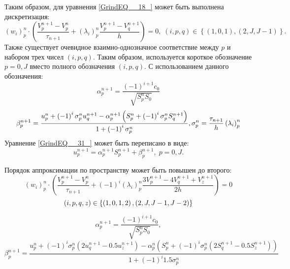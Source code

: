 Таким образом, для уравнения \eqref{GrindEQ__18_} может быть выполнена дискретизация:
\begin{equation} \label{GrindEQ__31_} 
\left(w_{i} \right)_{p}^{n} \cdot \left(\frac{V_{p}^{n+1} -V_{p}^{n} }{\tau _{n+1} } +\left(\lambda _{i} \right)_{p}^{n} \frac{V_{p}^{n+1} -V_{q}^{n+1} }{h} \right)=0,\; \left(i,p,q\right)\in \left\{\left(1,0,1\right),\left(2,J,J-1\right)\right\}.  
\end{equation} 
Также существует очевидное взаимно-однозначное соответствие между $p$ и набором трех чисел $\left(i,p,q\right)$. Таким образом, используется короткое обозначение $p=0,J$ вместо полного обозначения $\left(i,p,q\right)$. С использованием данного обозначения:
\begin{equation} \label{GrindEQ__32_} 
\alpha _{p}^{n+1} =\frac{\left(-1\right)^{i+1} c_{0} }{\sqrt{S_{p}^{n} S_{0} } } 
\end{equation} 
\begin{equation} 
\beta _{p}^{n+1} =\frac{u_{p}^{n} +\left(-1\right)^{i} \sigma _{p}^{n} u_{q}^{n+1} -\alpha _{p}^{n+1} \left(S_{p}^{n} +\left(-1\right)^{i} \sigma _{p}^{n} S_{q}^{n+1} \right)}{1+\left(-1\right)^{i} \sigma _{p}^{n} } , \sigma _{p}^{n} =\frac{\tau _{n+1} }{h} \left(\lambda _{i} \right)_{p}^{n}  \notag
\end{equation} 
Уравнение \eqref{GrindEQ__31_} может быть переписано в виде:
\begin{equation} \label{GrindEQ__33_} 
u_{p}^{n+1} =\alpha _{p}^{n+1} S_{p}^{n+1} +\beta _{p}^{n+1} ,\; p=0,J.  
\end{equation} 

Порядок аппроксимации по пространству может быть повышен до второго:
\begin{equation} \label{GrindEQ__31_2order} 
\left(w_{i} \right)_{p}^{n} \cdot \left(\frac{V_{p}^{n+1} -V_{p}^{n} }{\tau _{n+1} } +(-1)^{i}\left(\lambda _{i} \right)_{p}^{n} \frac{3V_{p}^{n+1}-4V_{q}^{n+1}+V_{z}^{n+1}}{2h} \right)=0 
\end{equation} 
\begin{equation}
\left(i,p,q,z\right)\in \left\{\left(1,0,1,2\right),\left(2,J,J-1,J-2\right)\right\} \notag
\end{equation}

\begin{equation}
 \alpha _{p}^{n+1} =\frac{\left(-1\right)^{i+1} c_{0} }{\sqrt{S_{p}^{n} S_{0} } } ,
\end{equation} 
\begin{equation} 
\beta _{p}^{n+1} =\frac{u_{p}^{n} +\left(-1\right)^{i} \sigma _{p}^{n} \left(2u_{q}^{n+1}-0.5u_{z}^{n+1}\right) -\alpha _{p}^{n} \left(S_{p}^{n} +\left(-1\right)^{i} \sigma _{p}^{n} \left(2S_{q}^{n+1}-0.5S_{z}^{n+1}\right) \right)}{1+\left(-1\right)^{i}1.5\sigma _{p}^{n} }    
\end{equation} 

